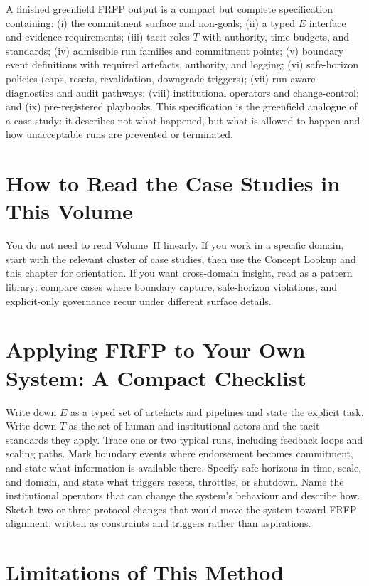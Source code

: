 A finished greenfield FRFP output is a compact but complete specification containing: (i) the commitment surface and non-goals; (ii) a typed \(E\) interface and evidence requirements; (iii) tacit roles \(T\) with authority, time budgets, and standards; (iv) admissible run families and commitment points; (v) boundary event definitions with required artefacts, authority, and logging; (vi) safe-horizon policies (caps, resets, revalidation, downgrade triggers); (vii) run-aware diagnostics and audit pathways; (viii) institutional operators and change-control; and (ix) pre-registered playbooks. This specification is the greenfield analogue of a case study: it describes not what happened, but what is allowed to happen and how unacceptable runs are prevented or terminated.


\section{How to Read the Case Studies in This Volume}

You do not need to read Volume~II linearly. If you work in a specific domain, start with the relevant cluster of case studies, then use the Concept Lookup and this chapter for orientation. If you want cross-domain insight, read as a pattern library: compare cases where boundary capture, safe-horizon violations, and explicit-only governance recur under different surface details.

\section{Applying FRFP to Your Own System: A Compact Checklist}

Write down \(E\) as a typed set of artefacts and pipelines and state the explicit task. Write down \(T\) as the set of human and institutional actors and the tacit standards they apply. Trace one or two typical runs, including feedback loops and scaling paths. Mark boundary events where endorsement becomes commitment, and state what information is available there. Specify safe horizons in time, scale, and domain, and state what triggers resets, throttles, or shutdown. Name the institutional operators that can change the system’s behaviour and describe how. Sketch two or three protocol changes that would move the system toward FRFP alignment, written as constraints and triggers rather than aspirations.

\section{Limitations of This Method}

